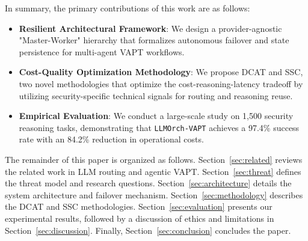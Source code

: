 In summary, the primary contributions of this work are as follows:
\begin{itemize}
    \item \textbf{Resilient Architectural Framework}: We design a provider-agnostic "Master-Worker" hierarchy that formalizes autonomous failover and state persistence for multi-agent VAPT workflows.
    \item \textbf{Cost-Quality Optimization Methodology}: We propose DCAT and SSC, two novel methodologies that optimize the cost-reasoning-latency tradeoff by utilizing security-specific technical signals for routing and reasoning reuse.
    \item \textbf{Empirical Evaluation}: We conduct a large-scale study on 1,500 security reasoning tasks, demonstrating that \texttt{LLMOrch-VAPT} achieves a 97.4\% success rate with an 84.2\% reduction in operational costs.
\end{itemize}

The remainder of this paper is organized as follows. Section~\ref{sec:related} reviews the related work in LLM routing and agentic VAPT. Section~\ref{sec:threat} defines the threat model and research questions. Section~\ref{sec:architecture} details the system architecture and failover mechanism. Section~\ref{sec:methodology} describes the DCAT and SSC methodologies. Section~\ref{sec:evaluation} presents our experimental results, followed by a discussion of ethics and limitations in Section~\ref{sec:discussion}. Finally, Section~\ref{sec:conclusion} concludes the paper.

